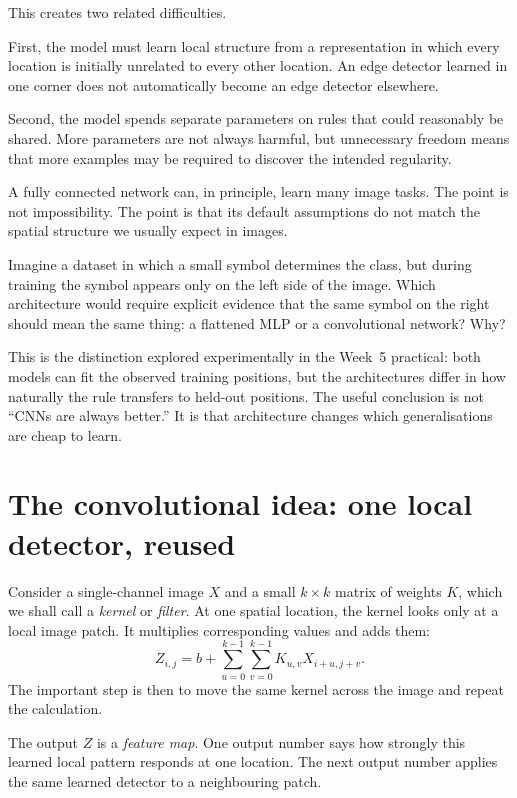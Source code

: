 This creates two related difficulties.

First, the model must learn local structure from a representation in which every location is initially unrelated to every other location. An edge detector learned in one corner does not automatically become an edge detector elsewhere.

Second, the model spends separate parameters on rules that could reasonably be shared. More parameters are not always harmful, but unnecessary freedom means that more examples may be required to discover the intended regularity.

A fully connected network can, in principle, learn many image tasks. The point is not impossibility. The point is that its default assumptions do not match the spatial structure we usually expect in images.

\begin{checkpointbox}
Imagine a dataset in which a small symbol determines the class, but during training the symbol appears only on the left side of the image. Which architecture would require explicit evidence that the same symbol on the right should mean the same thing: a flattened MLP or a convolutional network? Why?
\end{checkpointbox}

This is the distinction explored experimentally in the Week~5 practical: both models can fit the observed training positions, but the architectures differ in how naturally the rule transfers to held-out positions. The useful conclusion is not ``CNNs are always better.'' It is that architecture changes which generalisations are cheap to learn.

\section{The convolutional idea: one local detector, reused}

Consider a single-channel image \(X\) and a small \(k\times k\) matrix of weights \(K\), which we shall call a \emph{kernel} or \emph{filter}. At one spatial location, the kernel looks only at a local image patch. It multiplies corresponding values and adds them:
\begin{equation}
  Z_{i,j}
  = b + \sum_{u=0}^{k-1}\sum_{v=0}^{k-1}
  K_{u,v} X_{i+u,j+v}.
  \label{eq:week5-conv2d}
\end{equation}
The important step is then to move the same kernel across the image and repeat the calculation.

The output \(Z\) is a \emph{feature map}. One output number says how strongly this learned local pattern responds at one location. The next output number applies the same learned detector to a neighbouring patch.


